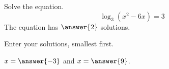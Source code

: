\documentclass{ximera}
\author{Bobby Ramsey}
\begin{document}
\begin{exercise}
	Solve the equation.
	\[ \log_3(x^2-6x) = 3 \]
	The equation has $\answer{2}$ solutions.

	\begin{exercise}
		Enter your solutions, smallest first.
		
		$x = \answer{-3}$ and $x = \answer{9}$.
	
		
	\end{exercise}
\end{exercise}
\end{document}
